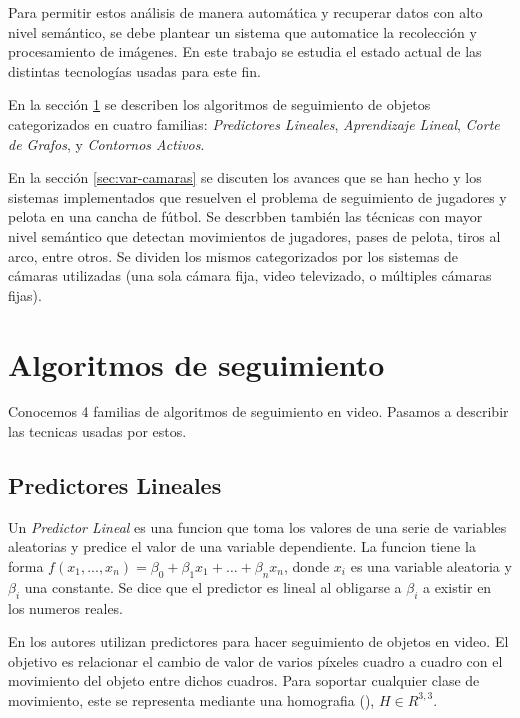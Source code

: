 \documentclass[a4paper,10pt]{article}
\begin{document}
Para permitir estos análisis de manera automática y recuperar datos con alto
nivel semántico, se debe plantear un sistema que automatice la recolección
y procesamiento de imágenes. En este trabajo se estudia el estado
actual de las distintas tecnologías usadas para este fin.

En la sección \ref{sec:tracking} se describen los algoritmos de seguimiento
de objetos categorizados en cuatro familias:
\textit{Predictores Lineales},
\textit{Aprendizaje Lineal},
\textit{Corte de Grafos},
y \textit{Contornos Activos}.

En la sección \ref{sec:var-camaras} se discuten los avances que se han hecho
y los sistemas implementados que resuelven el problema de seguimiento de
jugadores y pelota en una cancha de fútbol. Se descrbben también las técnicas
con mayor nivel semántico que detectan movimientos de jugadores, pases de
pelota, tiros al arco, entre otros. Se dividen los mismos categorizados por los
sistemas de cámaras utilizadas (una sola cámara fija, video televizado, o
múltiples cámaras fijas).

\newpage

\section{Algoritmos de seguimiento}
\label{sec:tracking}

Conocemos 4 familias de algoritmos de seguimiento en video.
Pasamos a describir las tecnicas usadas por estos.

\subsection{Predictores Lineales}

Un \textit{Predictor Lineal} es una funcion que toma los valores de una serie
de variables aleatorias y predice el valor de una variable dependiente.  La
funcion tiene la forma $f(x_1, ..., x_n) = \beta_0 + \beta_1 x_1 + \dots +
\beta_n x_n$, donde $x_i$ es una variable aleatoria y $\beta_i$ una constante.
Se dice que el predictor es lineal al obligarse a $\beta_i$ a existir en los
numeros reales.

En \cite{alp, original-linear-predictors} los autores utilizan predictores para
hacer seguimiento de objetos en video.  El objetivo es relacionar el cambio de
valor de varios píxeles cuadro a cuadro con el movimiento del objeto entre
dichos cuadros.  Para soportar cualquier clase de movimiento, este se
representa mediante una homografia (\cite{homography-estimation}), $H \in
R^{3,3}$.
\end{document}
